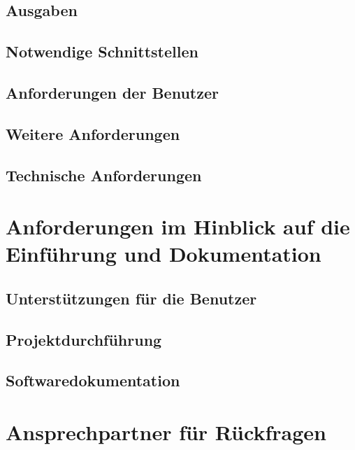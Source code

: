 \documentclass[10pt,a4paper]{article}
\begin{document}
\subsection{Ausgaben}
\subsection{Notwendige Schnittstellen}
\subsection{Anforderungen der Benutzer}
\subsection{Weitere Anforderungen}
\subsection{Technische Anforderungen}
\newpage 
\section{Anforderungen im Hinblick auf die Einführung und Dokumentation}
\subsection{Unterstützungen für die Benutzer}
\subsection{Projektdurchführung}
\subsection{Softwaredokumentation}
\newpage 
\section{Ansprechpartner für Rückfragen}
\newpage 
\end{document}
